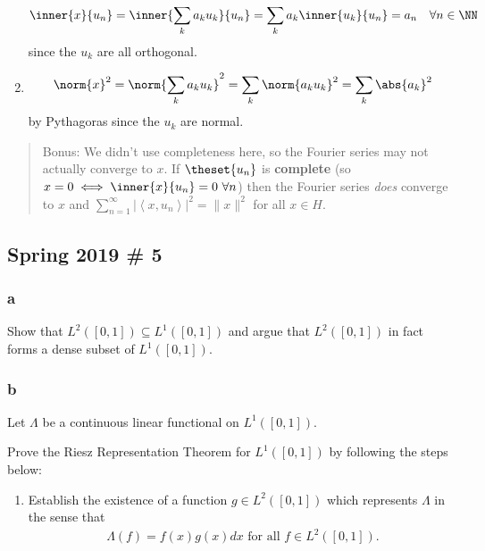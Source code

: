 \begin{solution}
\begin{enumerate}
  \begin{align*}
  \inner{x}{u_n} = \inner{\sum_k a_k u_k}{u_n} = \sum_k a_k \inner{u_k}{u_n} = a_n \quad \forall n\in \NN
  \end{align*} since the \(u_k\) are all orthogonal.
\item

  \begin{align*}
  \norm{x}^2 = \norm{\sum_k a_k u_k}^2 = \sum_k \norm{a_k u_k}^2 = \sum_k \abs{a_k}^2
  \end{align*} by Pythagoras since the \(u_k\) are normal.
\end{enumerate}

\begin{quote}
Bonus: We didn't use completeness here, so the Fourier series may not
actually converge to \(x\). If \(\theset{u_n}\) is \textbf{complete} (so
\(x = 0 \iff \inner{x}{u_n} = 0 ~\forall n\)) then the Fourier series
\emph{does} converge to \(x\) and
\(\sum_{n=1}^{\infty}\left|\left\langle x, u_{n}\right\rangle\right|^{2}=\|x\|^{2}\)
for all \(x \in H\).
\end{quote}

\end{solution}

\hypertarget{spring-2019-5}{%
\subsection{Spring 2019 \# 5}\label{spring-2019-5}}

\hypertarget{a-21}{%
\subsubsection{a}\label{a-21}}

Show that \(L^2([0, 1]) ⊆ L^1([0, 1])\) and argue that \(L^2([0, 1])\)
in fact forms a dense subset of \(L^1([0, 1])\).

\hypertarget{b-20}{%
\subsubsection{b}\label{b-20}}

Let \(Λ\) be a continuous linear functional on \(L^1([0, 1])\).

Prove the Riesz Representation Theorem for \(L^1([0, 1])\) by following
the steps below:

\begin{enumerate}
\def\labelenumi{\roman{enumi}.}
\tightlist
\item
  Establish the existence of a function \(g ∈ L^2([0, 1])\) which
  represents \(Λ\) in the sense that
  \begin{align*}
    Λ(f ) = f (x)g(x) dx \text{ for all } f ∈ L^2([0, 1]).
    \end{align*}
\end{enumerate}

